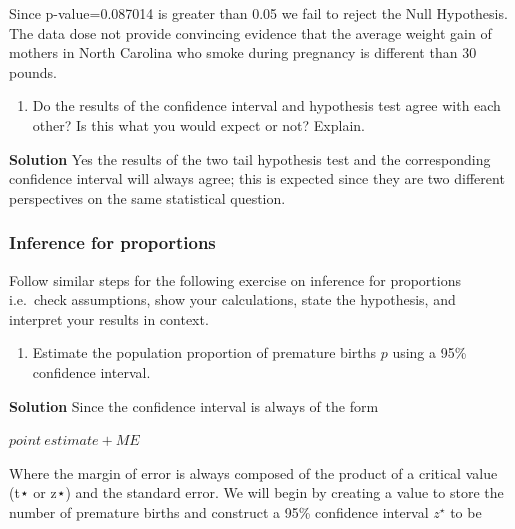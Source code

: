 \documentclass[
]{article}
\providecommand{\tightlist}{%
  \setlength{\itemsep}{0pt}\setlength{\parskip}{0pt}}
\begin{document}
Since p-value=0.087014 is greater than 0.05 we fail to reject the Null
Hypothesis. The data dose not provide convincing evidence that the
average weight gain of mothers in North Carolina who smoke during
pregnancy is different than 30 pounds.

\begin{enumerate}
\def\labelenumi{\arabic{enumi}.}
\setcounter{enumi}{4}
\tightlist
\item
  Do the results of the confidence interval and hypothesis test agree
  with each other? Is this what you would expect or not? Explain.
\end{enumerate}

\textbf{Solution} Yes the results of the two tail hypothesis test and
the corresponding confidence interval will always agree; this is
expected since they are two different perspectives on the same
statistical question.

\subsubsection{Inference for
proportions}\label{inference-for-proportions}

Follow similar steps for the following exercise on inference for
proportions i.e.~check assumptions, show your calculations, state the
hypothesis, and interpret your results in context.

\begin{enumerate}
\def\labelenumi{\arabic{enumi}.}
\setcounter{enumi}{5}
\tightlist
\item
  Estimate the population proportion of premature births \(p\) using a
  95\% confidence interval.
\end{enumerate}

\textbf{Solution} Since the confidence interval is always of the form

\begin{center}
$ point~estimate + ME$
\end{center}

Where the margin of error is always composed of the product of a
critical value (t⋆ or z⋆) and the standard error. We will begin by
creating a value to store the number of premature births and construct a
95\% confidence interval \(z^\star\) to be
\end{document}
